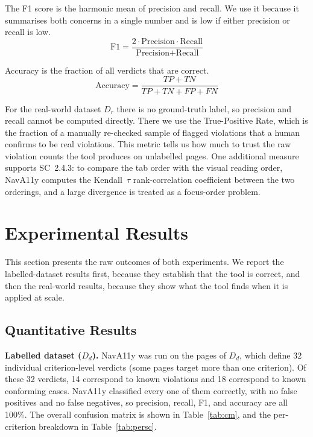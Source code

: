 The F1 score is the harmonic mean of precision and recall. We use it because it summarises
both concerns in a single number and is low if either precision or recall is low.
\begin{equation}
  \text{F1} = \frac{2 \cdot \text{Precision} \cdot \text{Recall}}{\text{Precision} + \text{Recall}}
\end{equation}

Accuracy is the fraction of all verdicts that are correct.
\begin{equation}
  \text{Accuracy} = \frac{TP + TN}{TP + TN + FP + FN}
\end{equation}

For the real-world dataset $D_r$ there is no ground-truth label, so precision and recall
cannot be computed directly. There we use the True-Positive Rate, which is the fraction of
a manually re-checked sample of flagged violations that a human confirms to be real
violations. This metric tells us how much to trust the raw violation counts the tool
produces on unlabelled pages. One additional measure supports SC~2.4.3: to compare the tab
order with the visual reading order, NavA11y computes the Kendall~$\tau$ rank-correlation
coefficient between the two orderings, and a large divergence is treated as a focus-order
problem.

\section{Experimental Results}
\label{sec:res-results}

This section presents the raw outcomes of both experiments. We report the labelled-dataset
results first, because they establish that the tool is correct, and then the real-world
results, because they show what the tool finds when it is applied at scale.

\subsection{Quantitative Results}
\label{subsec:quant}

\textbf{Labelled dataset ($D_d$).} NavA11y was run on the pages of $D_d$, which define 32
individual criterion-level verdicts (some pages target more than one criterion). Of these
32 verdicts, 14 correspond to known violations and 18 correspond to known conforming cases.
NavA11y classified every one of them correctly, with no false positives and no false
negatives, so precision, recall, F1, and accuracy are all 100\%. The overall confusion
matrix is shown in Table~\ref{tab:cm}, and the per-criterion breakdown in
Table~\ref{tab:persc}.

